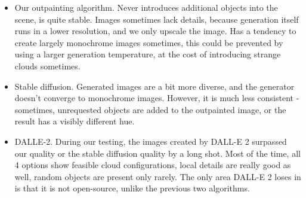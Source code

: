 \begin{itemize}
    \item Our outpainting algorithm. Never introduces additional objects into the scene, is quite stable. Images sometimes lack details, because generation itself runs in a lower resolution, and we only upscale the image. Has a tendency to create largely monochrome images sometimes, this could be prevented by using a larger generation temperature, at the cost of introducing strange clouds sometimes.
    \item Stable diffusion. Generated images are a bit more diverse, and the generator doesn't converge to monochrome images. However, it is much less consistent - sometimes, unrequested objects are added to the outpainted image, or the result has a visibly different hue.
    \item DALLE-2. During our testing, the images created by DALL-E 2 surpassed our quality or the stable diffusion quality by a long shot. Most of the time, all 4 options show feasible cloud configurations, local details are really good as well, random objects are present only rarely. The only area DALL-E 2 loses in is that it is not open-source, unlike the previous two algorithms.
\end{itemize}

